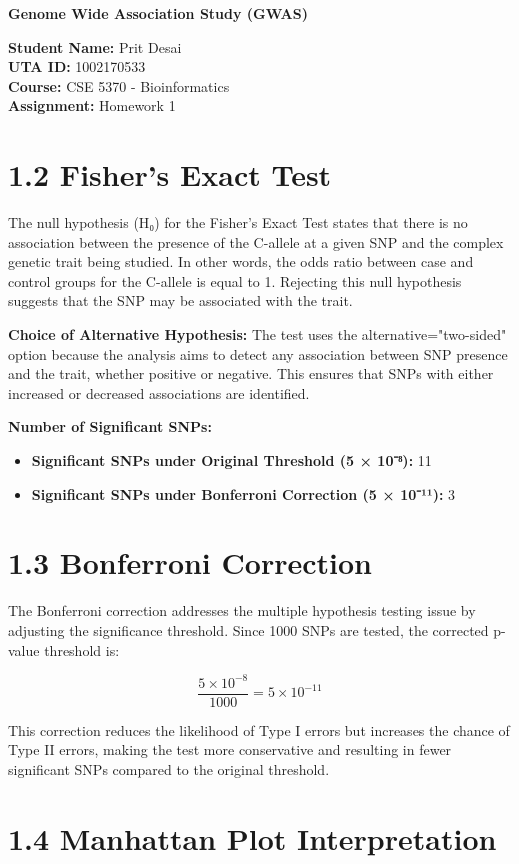 \documentclass[12pt]{article}
\author{}
\date{}
\begin{document}
\textbf{Genome Wide Association Study (GWAS)}

\textbf{Student Name:} Prit Desai\\
\textbf{UTA ID:} 1002170533\\
\textbf{Course:} CSE 5370 - Bioinformatics\\
\textbf{Assignment:} Homework 1

\section*{1.2 Fisher's Exact Test}

The null hypothesis (H₀) for the Fisher's Exact Test states that there is no association between the presence of the C-allele at a given SNP and the complex genetic trait being studied. In other words, the odds ratio between case and control groups for the C-allele is equal to 1. Rejecting this null hypothesis suggests that the SNP may be associated with the trait.

\textbf{Choice of Alternative Hypothesis:} The test uses the alternative="two-sided" option because the analysis aims to detect any association between SNP presence and the trait, whether positive or negative. This ensures that SNPs with either increased or decreased associations are identified.

\textbf{Number of Significant SNPs:}
\begin{itemize}
  \item \textbf{Significant SNPs under Original Threshold (5 × 10⁻⁸):} 11
  \item \textbf{Significant SNPs under Bonferroni Correction (5 × 10⁻¹¹):} 3
\end{itemize}

\section*{1.3 Bonferroni Correction}

The Bonferroni correction addresses the multiple hypothesis testing issue by adjusting the significance threshold. Since 1000 SNPs are tested, the corrected p-value threshold is:

\[
\frac{5 \times 10^{-8}}{1000} = 5 \times 10^{-11}
\]

This correction reduces the likelihood of Type I errors but increases the chance of Type II errors, making the test more conservative and resulting in fewer significant SNPs compared to the original threshold.

\section*{1.4 Manhattan Plot Interpretation}
\end{document}
